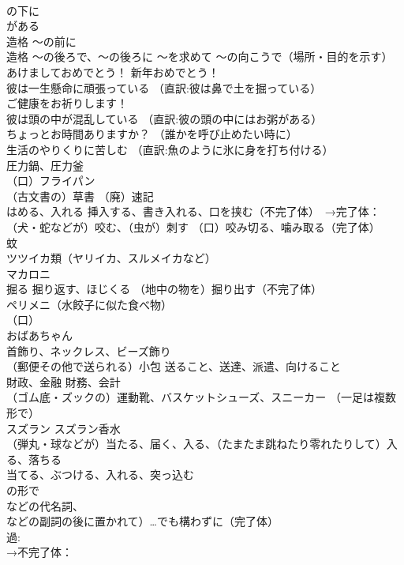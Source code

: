 \documentclass[8pt]{extreport}
\begin{document}
\begin{CJK}{UTF8}{min}
\\	の下に
\\	がある
\\	造格	〜の前に
\\	造格	～の後ろで、〜の後ろに ～を求めて ～の向こうで（場所・目的を示す）
\\	あけましておめでとう！ 新年おめでとう！
\\	彼は一生懸命に頑張っている （直訳:彼は鼻で土を掘っている）
\\	ご健康をお祈りします！
\\	彼は頭の中が混乱している （直訳:彼の頭の中にはお粥がある）
\\	ちょっとお時間ありますか？ （誰かを呼び止めたい時に）
\\	生活のやりくりに苦しむ （直訳:魚のように氷に身を打ち付ける）
\\	圧力鍋、圧力釜
\\	（口）フライパン
\\	（古文書の）草書 （廃）速記
\\	はめる、入れる 挿入する、書き入れる、口を挟む（不完了体）　→完了体：
\\	（犬・蛇などが）咬む、（虫が）刺す （口）咬み切る、噛み取る（完了体）
\\	蚊
\\	ツツイカ類（ヤリイカ、スルメイカなど）
\\	マカロニ
\\	掘る 掘り返す、ほじくる （地中の物を）掘り出す（不完了体）
\\	ペリメニ（水餃子に似た食べ物）
\\	[表愛]（口）
\\	おばあちゃん
\\	首飾り、ネックレス、ビーズ飾り
\\	（郵便その他で送られる）小包 送ること、送達、派遣、向けること
\\	財政、金融 財務、会計
\\	（ゴム底・ズックの）運動靴、バスケットシューズ、スニーカー （一足は複数形で）
\\	スズラン スズラン香水
\\	（弾丸・球などが）当たる、届く、入る、（たまたま跳ねたり零れたりして）入る、落ちる 
\\	当てる、ぶつける、入れる、突っ込む 
\\	の形で
\\	などの代名詞、
\\	などの副詞の後に置かれて）…でも構わずに（完了体） 
\\	過:
\\	→不完了体：

\end{CJK}
\end{document}
